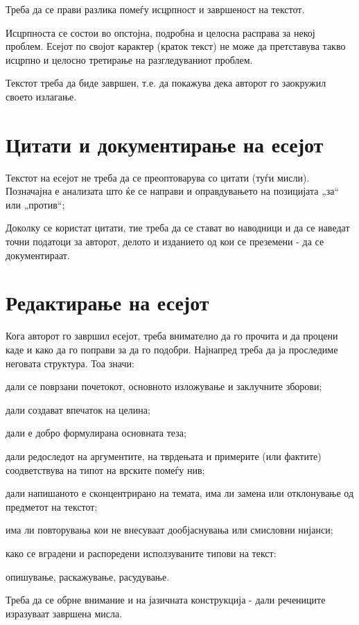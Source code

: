 \documentclass[12pt,a4paper]{article}
\begin{document}
Треба да се прави разлика помеѓу исцрпност и завршеност на текстот.

Исцрпноста се состои во опстојна, подробна и целосна расправа за некој проблем.
Есејот по својот карактер (краток текст) не може да претставува так­во исцрпно и
целосно третирање на разгледуваниот проблем.

Текстот треба да биде завршен, т.е. да покажува дека авторот го заокружил
своето излагање.

\section{Цитати и документирање на есејот}

Текстот на есејот не треба да се преоптоварува со цитати (туѓи мисли).
Позначајна е анализата што ќе се направи и оправдувањето на позицијата „за“ или
„против“;

Доколку се користат цитати, тие треба да се стават во навод­ници и да се наведат
точни податоци за авторот, делото и изданието од кои се преземени - да се
документираат.


\section{Редактирање на есејот}

Кога авторот го завршил есејот, треба внимателно да го прочита и да процени каде
и како да го поправи за да го подобри. Најнапред треба да ја проследиме неговата
струк­тура. Тоа значи:

дали се поврзани почетокот, основното изложување и заклучните зборови;

дали создават впечаток на целина;

дали е добро формулирана основната теза;

дали редоследот на аргументите, на тврдењата и при­мерите (или фактите)
           соодветствува на типот на врските помеѓу нив;

дали напишаното е сконцентрирано на темата, има ли замена или отклонување од
предметот на текстот;

има ли повторувања кои не внесуваат дообјаснувања или смисловни нијанси;

како се вградени и распоредени исползуваните типови на текст:   

опишување, раскажување, расудување.

Треба да се обрне внимание и на јазичната конструкција - дали речениците
изразуваат завршена мисла.
\end{document}
